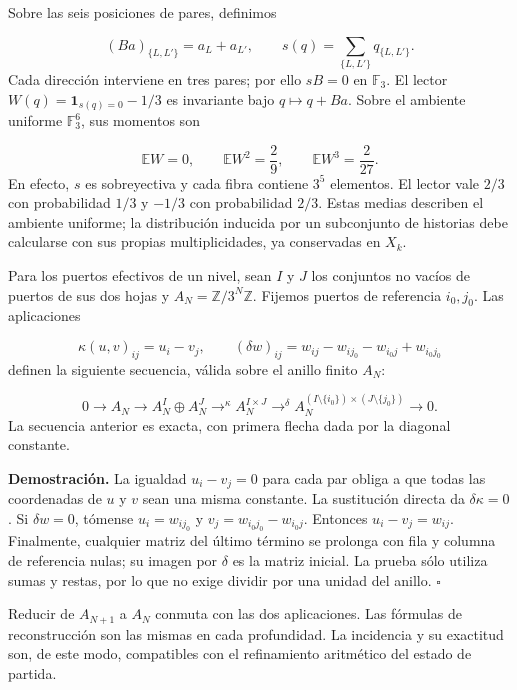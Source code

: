 Sobre las seis posiciones de pares, definimos

\[
(Ba)_{\{L,L'\}}=a_L+a_{L'},
\qquad
s(q)=\sum_{\{L,L'\}}q_{\{L,L'\}}.
\]
Cada dirección interviene en tres pares; por ello \(sB=0\) en \(\mathbb F_3\). El lector \(W(q)=\mathbf1_{s(q)=0}-1/3\) es invariante bajo \(q\mapsto q+Ba\). Sobre el ambiente uniforme \(\mathbb F_3^6\), sus momentos son

\[
\mathbb EW=0,\qquad
\mathbb EW^2=\frac29,\qquad
\mathbb EW^3=\frac2{27}.
\]
En efecto, \(s\) es sobreyectiva y cada fibra contiene \(3^5\) elementos. El lector vale \(2/3\) con probabilidad \(1/3\) y \(-1/3\) con probabilidad \(2/3\). Estas medias describen el ambiente uniforme; la distribución inducida por un subconjunto de historias debe calcularse con sus propias multiplicidades, ya conservadas en \(X_k\).

Para los puertos efectivos de un nivel, sean \(I\) y \(J\) los conjuntos no vacíos de puertos de sus dos hojas y \(A_N=\mathbb Z/3^N\mathbb Z\). Fijemos puertos de referencia \(i_0,j_0\). Las aplicaciones

\[
\kappa(u,v)_{ij}=u_i-v_j,
\qquad
(\delta w)_{ij}=w_{ij}-w_{ij_0}-w_{i_0j}+w_{i_0j_0}
\]
definen la siguiente secuencia, válida sobre el anillo finito \(A_N\):

\[
0\longrightarrow A_N\longrightarrow
A_N^I\oplus A_N^J\mathrel{\mathop{\longrightarrow}^{\kappa}}
A_N^{I\times J}\mathrel{\mathop{\longrightarrow}^{\delta}}
A_N^{(I\setminus\{i_0\})\times(J\setminus\{j_0\})}
\longrightarrow0.
\]
La secuencia anterior es exacta, con primera flecha dada por la diagonal constante.

\textbf{Demostración.} La igualdad \(u_i-v_j=0\) para cada par obliga a que todas las coordenadas de \(u\) y \(v\) sean una misma constante. La sustitución directa da \(\delta\kappa=0\). Si \(\delta w=0\), tómense \(u_i=w_{ij_0}\) y \(v_j=w_{i_0j_0}-w_{i_0j}\). Entonces \(u_i-v_j=w_{ij}\). Finalmente, cualquier matriz del último término se prolonga con fila y columna de referencia nulas; su imagen por \(\delta\) es la matriz inicial. La prueba sólo utiliza sumas y restas, por lo que no exige dividir por una unidad del anillo. \hfill\(\square\)

Reducir de \(A_{N+1}\) a \(A_N\) conmuta con las dos aplicaciones. Las fórmulas de reconstrucción son las mismas en cada profundidad. La incidencia y su exactitud son, de este modo, compatibles con el refinamiento aritmético del estado de partida.

